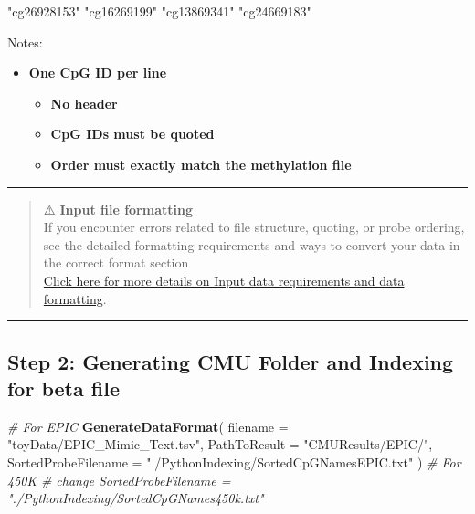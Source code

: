 \documentclass[
]{article}
\newenvironment{Shaded}{\begin{snugshade}}{\end{snugshade}}
\newcommand{\AttributeTok}[1]{\textcolor[rgb]{0.13,0.29,0.53}{#1}}
\newcommand{\CommentTok}[1]{\textcolor[rgb]{0.56,0.35,0.01}{\textit{#1}}}
\newcommand{\FunctionTok}[1]{\textcolor[rgb]{0.13,0.29,0.53}{\textbf{#1}}}
\newcommand{\NormalTok}[1]{#1}
\newcommand{\StringTok}[1]{\textcolor[rgb]{0.31,0.60,0.02}{#1}}
\providecommand{\tightlist}{%
  \setlength{\itemsep}{0pt}\setlength{\parskip}{0pt}}
\begin{document}
\begin{Shaded}
\begin{Highlighting}[]
\NormalTok{"cg26928153"}
\NormalTok{"cg16269199"}
\NormalTok{"cg13869341"}
\NormalTok{"cg24669183"}
\end{Highlighting}
\end{Shaded}

Notes:

\begin{itemize}
\tightlist
\item
  \textbf{One CpG ID per line}

  \begin{itemize}
  \tightlist
  \item
    \textbf{No header}
  \item
    \textbf{CpG IDs must be quoted}
  \item
    \textbf{Order must exactly match the methylation file}
  \end{itemize}
\end{itemize}

\begin{center}\rule{0.5\linewidth}{0.5pt}\end{center}

\begin{quote}
⚠️ \textbf{Input file formatting}\\
If you encounter errors related to file structure, quoting, or probe
ordering,\\
see the detailed formatting requirements and ways to convert your data
in the correct format section\\
\hyperref[detailed-input-data-requirements-and-data-formatting]{Click
here for more details on Input data requirements and data formatting}.
\end{quote}

\begin{center}\rule{0.5\linewidth}{0.5pt}\end{center}

\subsection{Step 2: Generating CMU Folder and Indexing for beta
file}\label{step2-indexing}

\begin{Shaded}
\begin{Highlighting}[]
\CommentTok{\# For EPIC }
\FunctionTok{GenerateDataFormat}\NormalTok{(}
\AttributeTok{filename =} \StringTok{"toyData/EPIC\_Mimic\_Text.tsv"}\NormalTok{,}
\AttributeTok{PathToResult =} \StringTok{"CMUResults/EPIC/"}\NormalTok{,}
\AttributeTok{SortedProbeFilename =} \StringTok{"./PythonIndexing/SortedCpGNamesEPIC.txt"}
\NormalTok{)}
\CommentTok{\# For 450K }
\CommentTok{\# change SortedProbeFilename = "./PythonIndexing/SortedCpGNames450k.txt"}
\end{Highlighting}
\end{Shaded}
\end{document}

